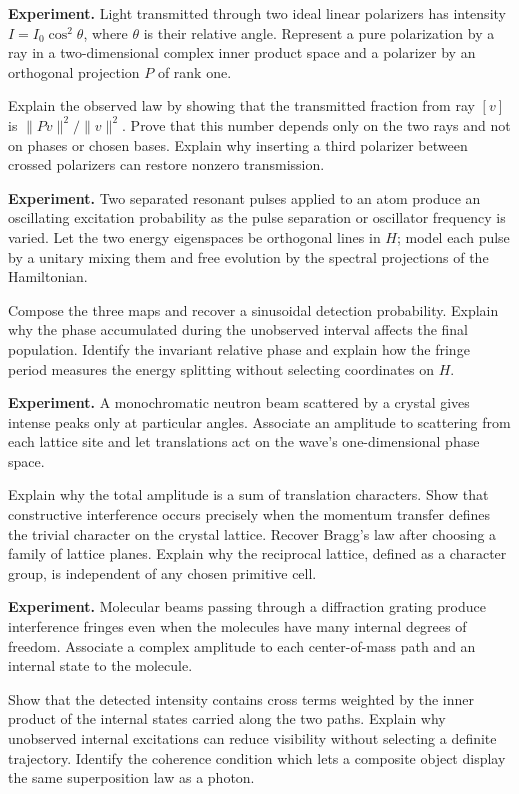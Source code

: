 \begin{exercise}
\textbf{Experiment.}
Light transmitted through two ideal linear polarizers has intensity
\(I=I_0\cos^2\theta\), where \(\theta\) is their relative angle.
Represent a pure polarization by a ray in a two-dimensional complex inner
product space and a polarizer by an orthogonal projection \(P\) of rank one.

Explain the observed law by showing that the transmitted fraction from ray
\([v]\) is \(\|Pv\|^2/\|v\|^2\).  Prove that this number depends only on the
two rays and not on phases or chosen bases.  Explain why inserting a third
polarizer between crossed polarizers can restore nonzero transmission.
\end{exercise}

\begin{exercise}
\textbf{Experiment.}
Two separated resonant pulses applied to an atom produce an oscillating
excitation probability as the pulse separation or oscillator frequency is
varied.  Let the two energy eigenspaces be orthogonal lines in \(H\); model
each pulse by a unitary mixing them and free evolution by the spectral
projections of the Hamiltonian.

Compose the three maps and recover a sinusoidal detection probability.
Explain why the phase accumulated during the unobserved interval affects the
final population.  Identify the invariant relative phase and explain how the
fringe period measures the energy splitting without selecting coordinates on
\(H\).
\end{exercise}

\begin{exercise}
\textbf{Experiment.}
A monochromatic neutron beam scattered by a crystal gives intense peaks only
at particular angles.  Associate an amplitude to scattering from each lattice
site and let translations act on the wave's one-dimensional phase space.

Explain why the total amplitude is a sum of translation characters.  Show
that constructive interference occurs precisely when the momentum transfer
defines the trivial character on the crystal lattice.  Recover Bragg's law
after choosing a family of lattice planes.  Explain why the reciprocal
lattice, defined as a character group, is independent of any chosen primitive
cell.
\end{exercise}

\begin{exercise}
\textbf{Experiment.}
Molecular beams passing through a diffraction grating produce interference
fringes even when the molecules have many internal degrees of freedom.
Associate a complex amplitude to each center-of-mass path and an internal
state to the molecule.

Show that the detected intensity contains cross terms weighted by the inner
product of the internal states carried along the two paths.  Explain why
unobserved internal excitations can reduce visibility without selecting a
definite trajectory.  Identify the coherence condition which lets a composite
object display the same superposition law as a photon.
\end{exercise}
